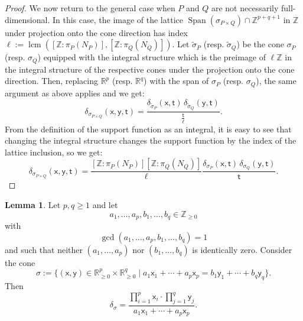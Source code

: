 \documentclass[11pt]{article}
\def\ZZ{\mathbb{Z}}
\DeclareMathOperator{\lcm}{lcm}
\newcommand{\RR}{\mathbb{R}}
\DeclareMathOperator{\Span}{Span}
\theoremstyle{definition}
\newtheorem{lemma}[definition]{Lemma}
\begin{document}
\begin{proof}
	We now return to the general case when $P$ and $Q$ are not necessarily full-dimensional.
	In this case, the image of the lattice $\Span(\sigma_{P\times Q})\cap \mathbb{Z}^{p+q+1}$ in $\mathbb{Z}$ under projection onto
	the cone direction has index $\ell:=\lcm([\mathbb{Z}:\pi_P(N_P)],[\mathbb{Z}:\pi_Q(N_Q)])$. Let $\tilde{\sigma}_P$
	(resp. $\tilde{\sigma}_Q$) be the cone $\sigma_P$ (resp. $\sigma_Q$)
	equipped with the integral structure which is the preimage of $\ell \mathbb{Z}$ in the integral structure of the respective cones
	under the projection onto the cone direction. Then, replacing $\mathbb{R}^{p}$ (resp. $\mathbb{R}^{q}$) with the span of $\sigma_P$ (resp. $\sigma_Q$),
	the same argument as above applies and we get:
	$$\delta_{\sigma_{P\times Q}}(\mathsf{x},\mathsf{y},\mathsf{t})=\frac{\delta_{\tilde{\sigma}_P}(\mathsf{x},\mathsf{t})\,\delta_{\tilde{\sigma}_Q}(\mathsf{y},\mathsf{t})}{\frac{\mathsf{t}}{\ell}}.$$
	From the definition of the support function as an integral, it is easy to see that changing the integral structure changes the support
	function by the index of the lattice inclusion, so we get:
	$$\delta_{\sigma_{P\times Q}}(\mathsf{x},\mathsf{y},\mathsf{t})=\frac{[\mathbb{Z}:\pi_P(N_P)][\mathbb{Z}:\pi_Q(N_Q)]}{\ell}\frac{\delta_{\sigma_P}(\mathsf{x},\mathsf{t})\,\delta_{\sigma_Q}(\mathsf{y},\mathsf{t})}{\mathsf{t}}.$$
\end{proof}

\begin{lemma}
	\label{lem:balanced-cone}
	Let $p,q\ge 1$ and let
	\[
		a_1,\dots,a_p,b_1,\dots,b_q\in \ZZ_{\ge 0}
	\]
	with
	\[
		\gcd(a_1,\dots,a_p,b_1,\dots,b_q)=1
	\]
	and such that neither $(a_1,\dots,a_p)$ nor $(b_1,\dots,b_q)$ is identically zero.
	Consider the cone
	\[
		\sigma:=\{(\mathsf{x},\mathsf{y})\in \RR_{\ge 0}^p\times \RR_{\ge 0}^q \mid a_1\mathsf{x}_1+\cdots+a_p\mathsf{x}_p=b_1\mathsf{y}_1+\cdots+b_q\mathsf{y}_q\}.
	\]
	Then
	\[
		\delta_\sigma=\frac{\prod_{i=1}^p \mathsf{x}_i\cdot \prod_{j=1}^q \mathsf{y}_j}{a_1\mathsf{x}_1+\cdots+a_p\mathsf{x}_p}.
	\]
\end{lemma}
\end{document}
